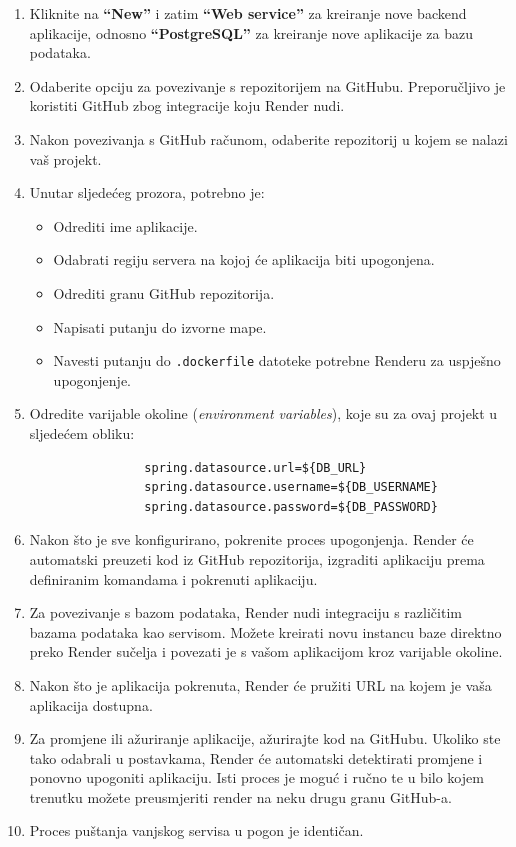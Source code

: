 		\begin{enumerate}
			\item Kliknite na \textbf{``New''} i zatim \textbf{``Web service''} za kreiranje nove backend aplikacije, odnosno \textbf{``PostgreSQL''} za kreiranje nove aplikacije za bazu podataka.
			
			\item Odaberite opciju za povezivanje s repozitorijem na GitHubu. Preporučljivo je koristiti GitHub zbog integracije koju Render nudi. 
			
			\item Nakon povezivanja s GitHub računom, odaberite repozitorij u kojem se nalazi vaš projekt.
			
			\item Unutar sljedećeg prozora, potrebno je:
			\begin{itemize}
				\item Odrediti ime aplikacije.
				\item Odabrati regiju servera na kojoj će aplikacija biti upogonjena.
				\item Odrediti granu GitHub repozitorija.
				\item Napisati putanju do izvorne mape.
				\item Navesti putanju do \texttt{.dockerfile} datoteke potrebne Renderu za uspješno upogonjenje.
			\end{itemize}
			
			\item Odredite varijable okoline (\textit{environment variables}), koje su za ovaj projekt u sljedećem obliku:
			\begin{verbatim}
				spring.datasource.url=${DB_URL}
				spring.datasource.username=${DB_USERNAME}
				spring.datasource.password=${DB_PASSWORD}
			\end{verbatim}
			
			\item Nakon što je sve konfigurirano, pokrenite proces upogonjenja. Render će automatski preuzeti kod iz GitHub repozitorija, izgraditi aplikaciju prema definiranim komandama i pokrenuti aplikaciju.
			
			\item Za povezivanje s bazom podataka, Render nudi integraciju s različitim bazama podataka kao servisom. Možete kreirati novu instancu baze direktno preko Render sučelja i povezati je s vašom aplikacijom kroz varijable okoline.
			
			\item Nakon što je aplikacija pokrenuta, Render će pružiti URL na kojem je vaša aplikacija dostupna.
			
			\item Za promjene ili ažuriranje aplikacije, ažurirajte kod na GitHubu. Ukoliko ste tako odabrali u postavkama, Render će automatski detektirati promjene i ponovno upogoniti aplikaciju. Isti proces je moguć i ručno te u bilo kojem trenutku možete preusmjeriti render na neku drugu granu GitHub-a.
			
			\item Proces puštanja vanjskog servisa u pogon je identičan.
		\end{enumerate}
		
			
			\eject 
